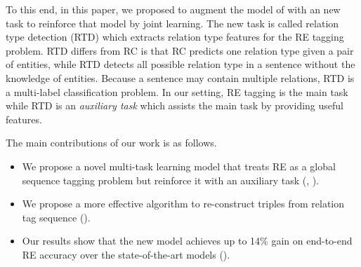 
To this end, in this paper, we proposed to augment the model 
of \citet{Zheng2017} with an new task to reinforce that model by joint learning. 
The new task is called relation type detection 
(RTD) which extracts relation type features for the RE tagging problem.
RTD differs from RC is that RC predicts one relation type given a pair of entities,
while RTD detects all possible relation type in a sentence without the knowledge
of entities. Because a sentence may contain multiple relations, RTD is a multi-label
classification problem.
In our setting, RE tagging is the main task while RTD is an {\em auxiliary
task} which assists the main task by providing useful features.


The main contributions of our work is as follows.
\begin{itemize}
\item We propose a novel multi-task learning model that treats RE as a global
sequence tagging problem but reinforce it with an auxiliary task (,
).
\item We propose a more effective algorithm to re-construct triples from relation
  tag sequence ().
\item Our results show that the new model achieves up to 14\% gain on end-to-end 
RE accuracy over the state-of-the-art models (). 
\end{itemize}

